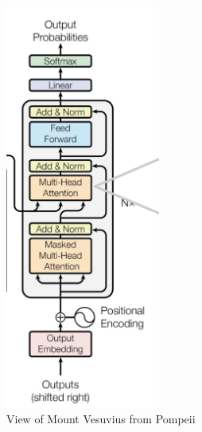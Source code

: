 \documentclass[12pt]{article}
\begin{document}
\begin{figure}[h!]
\centering
\includegraphics[width=2in]
{decoder.jpg}
\caption{View of Mount Vesuvius from
  Pompeii}
\label{fig-jpg}
\end{figure}
\end{document}
